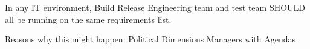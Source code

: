 In any IT environment, 
Build Release Engineering team and test team SHOULD all be running on the same requirements list.

Reasons why this might happen:
Political Dimensions
Managers with Agendas

